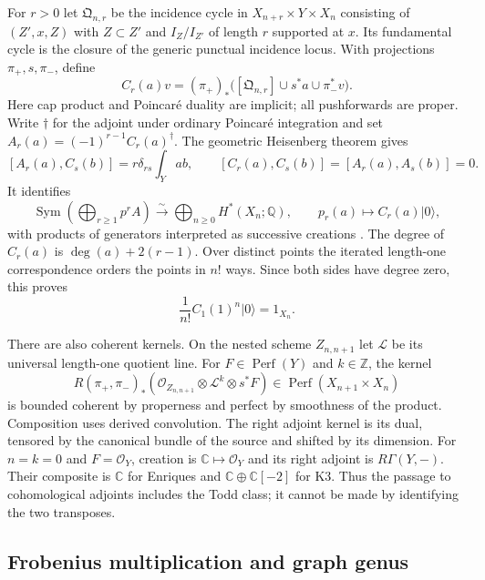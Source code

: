 For $r>0$ let $\mathfrak Q_{n,r}$ be the incidence cycle
in $X_{n+r}\times Y\times X_n$ consisting of
$(Z',x,Z)$ with $Z\subset Z'$ and $I_Z/I_{Z'}$ of length
$r$ supported at $x$. Its fundamental cycle is the closure
of the generic punctual incidence locus. With projections
$\pi_+,s,\pi_-$, define
\[
 C_r(a)v=(\pi_+)_*
   \bigl([\mathfrak Q_{n,r}]\cup s^*a\cup\pi_-^*v\bigr).
\]
Here cap product and Poincar\'e duality are implicit; all
pushforwards are proper. Write $\dagger$ for the adjoint
under ordinary Poincar\'e integration and set
$A_r(a)=(-1)^{r-1}C_r(a)^\dagger$.
The geometric Heisenberg theorem gives
\begin{equation}\label{cyprim:eq:Heisenberg}
 [A_r(a),C_s(b)]=r\delta_{rs}\int_Yab,
 \qquad [C_r(a),C_s(b)]=[A_r(a),A_s(b)]=0.
\end{equation}
It identifies
\begin{equation}\label{cyprim:eq:geometric-Fock}
 \operatorname{Sym}\left(\bigoplus_{r\ge1}p^rA\right)
 \xrightarrow{\sim}\bigoplus_{n\ge0}H^*(X_n;\mathbb Q),
 \qquad p_r(a)\longmapsto C_r(a)|0\rangle,
\end{equation}
with products of generators interpreted as successive
creations \cite{Nakajima97,rewriteLS2003}.
The degree of $C_r(a)$ is $\deg(a)+2(r-1)$.
Over distinct points the iterated length-one correspondence
orders the points in $n!$ ways. Since both sides have degree
zero, this proves
\begin{equation}\label{cyprim:eq:unit-state}
 \frac1{n!}C_1(1)^n|0\rangle=1_{X_n}.
\end{equation}

There are also coherent kernels. On the nested scheme
$Z_{n,n+1}$ let $\mathcal L$ be its universal length-one
quotient line. For $F\in\operatorname{Perf}(Y)$ and
$k\in\mathbb Z$, the kernel
\[
 R(\pi_+,\pi_-)_*
   (\mathcal O_{Z_{n,n+1}}\otimes\mathcal L^k\otimes s^*F)
 \in\operatorname{Perf}(X_{n+1}\times X_n)
\]
is bounded coherent by properness and perfect by smoothness
of the product. Composition uses derived convolution. The
right adjoint kernel is its dual, tensored by the canonical
bundle of the source and shifted by its dimension.
For $n=k=0$ and $F=\mathcal O_Y$, creation is
$\mathbb C\mapsto\mathcal O_Y$ and its right adjoint is
$R\Gamma(Y,-)$. Their composite is $\mathbb C$ for Enriques
and $\mathbb C\oplus\mathbb C[-2]$ for K3. Thus the passage
to cohomological adjoints includes the Todd class; it cannot
be made by identifying the two transposes.

\subsection{Frobenius multiplication and graph genus}

